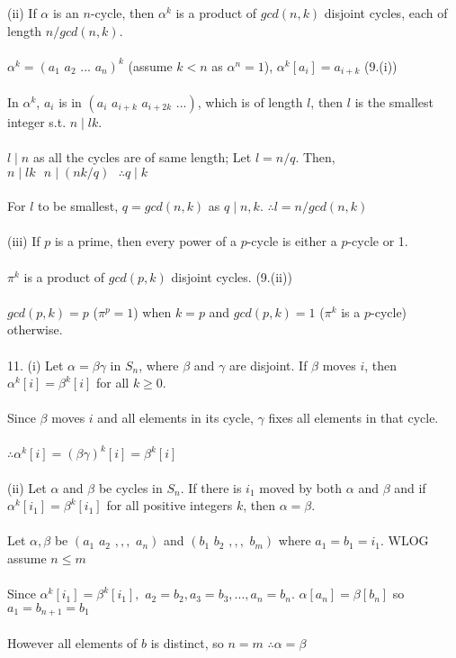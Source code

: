 \documentclass{article}
\begin{document}
\begin{siderules}
\color{blue}(ii) If \(\alpha\) is an \(n\)-cycle, then \(\alpha^k\) is a product of \(gcd(n, k)\) disjoint cycles, each of length \(n/gcd(n, k)\).\color{black}\\\\
\null\qquad \(\alpha^k=(a_1\,\,a_2\,\,...\,\,a_n)^k\) (assume \(k<n\) as \(\alpha^n=1\)), \(\alpha^k[a_i]=a_{i+k}\) \color{gray}(9.(i))\color{black}\\\\
\null\qquad In \(\alpha^k\), \(a_i\) is in \((a_i\,\,a_{i+k}\,\,a_{i+2k}\,\,...)\), which is of length \(l\), then \(l\) is the smallest integer s.t. \(n\mid lk\).\\\\
\null\qquad\(l\mid n\) as all the cycles are of same length; Let \(l=n/q\). Then, \(n\mid lk\,\,\,\,n\mid (nk/q)\,\,\,\,\therefore q\mid k\)\\\\
\null\qquad For \(l\) to be smallest, \(q=gcd(n,k)\) as \(q\mid n,k\). \(\therefore l=n/gcd(n,k)\)\\\\
\color{blue}(iii) If \(p\) is a prime, then every power of a \(p\)-cycle is either a \(p\)-cycle or 1.\color{black}\\\\
\null\qquad\(\pi^k\) is a product of \(gcd(p,k)\) disjoint cycles.  \color{gray}(9.(ii))\color{black}\\\\
\null\qquad\(gcd(p,k)=p\) (\(\pi^p=1\)) when \(k=p\) and \(gcd(p,k)=1\) (\(\pi^k\) is a \(p\)-cycle) otherwise.\\\\
\color{blue}11. (i) Let \(\alpha=\beta\gamma\) in \(S_n\), where \(\beta\) and \(\gamma\) are disjoint. If \(\beta\) moves \(i\), then \(\alpha^k[i]=\beta^k[i]\) for all \(k\ge 0\).\color{black}\\\\
\null\qquad Since \(\beta\) moves \(i\) and all elements in its cycle, \(\gamma\) fixes all elements in that cycle.\\\\
\null\qquad\(\therefore \alpha^k[i]=(\beta\gamma)^k[i]=\beta^k[i]\)\\\\
\color{blue}(ii) Let \(\alpha\) and \(\beta\) be cycles in \(S_n\). If there is \(i_1\) moved by both \(\alpha\) and \(\beta\) and if \(\alpha^k[i_1]=\beta^k[i_1]\) for all positive integers \(k\), then \(\alpha=\beta\).\color{black}\\\\
\null\qquad Let \(\alpha,\beta\) be \((a_1\,\,a_2\,\,,,,\,\,a_n)\) and \((b_1\,\,b_2\,\,,,,\,\,b_m)\) where \(a_1=b_1=i_1\). WLOG assume \(n\le m\)\\\\
\null\qquad Since \(\alpha^k[i_1]=\beta^k[i_1],\) \(a_2=b_2,a_3=b_3,...,a_n=b_n\). \(\alpha[a_n]=\beta[b_n]\) so \(a_1=b_{n+1}=b_1\)\\\\
\null\qquad However all elements of \(b\) is distinct, so \(n=m\) \(\therefore \alpha=\beta\)
\end{siderules}
\end{document}
